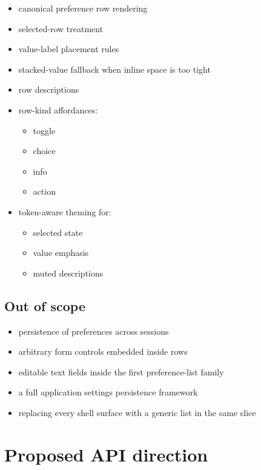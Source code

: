 \begin{itemize}
\tightlist
\item
  canonical preference row rendering
\item
  selected-row treatment
\item
  value-label placement rules
\item
  stacked-value fallback when inline space is too tight
\item
  row descriptions
\item
  row-kind affordances:

  \begin{itemize}
  \tightlist
  \item
    toggle
  \item
    choice
  \item
    info
  \item
    action
  \end{itemize}
\item
  token-aware theming for:

  \begin{itemize}
  \tightlist
  \item
    selected state
  \item
    value emphasis
  \item
    muted descriptions
  \end{itemize}
\end{itemize}

\subsection{Out of scope}\label{record-054-out-of-scope}

\begin{itemize}
\tightlist
\item
  persistence of preferences across sessions
\item
  arbitrary form controls embedded inside rows
\item
  editable text fields inside the first preference-list family
\item
  a full application settings persistence framework
\item
  replacing every shell surface with a generic list in the same slice
\end{itemize}

\section{Proposed API direction}\label{record-054-proposed-api-direction}

